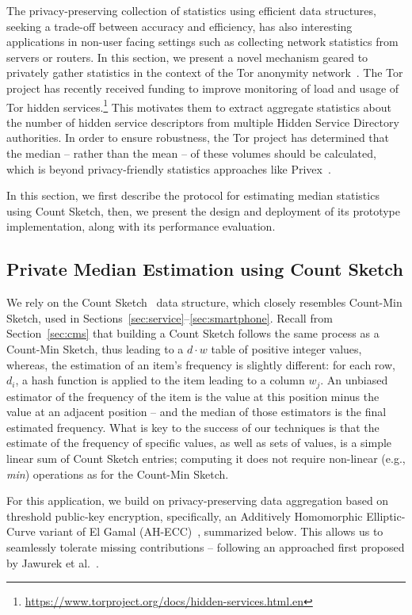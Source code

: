 \documentclass[conference]{IEEEtran}
\begin{document}
The privacy-preserving collection of statistics  using efficient data structures, seeking a trade-off between accuracy and efficiency, has also interesting applications in non-user facing settings such as 
collecting network statistics from servers or routers. 
In this section, we present a novel mechanism geared to  privately gather statistics in the context of the Tor anonymity network~\cite{Tor}. The Tor project has recently received funding to improve monitoring of load and usage of Tor hidden services.\footnote{\url{https://www.torproject.org/docs/hidden-services.html.en}} 
This motivates them to extract aggregate statistics about the number of hidden service descriptors from multiple Hidden Service Directory authorities. In order to ensure robustness, the Tor project has determined that the median -- rather than the mean -- of these volumes should be calculated, which is beyond privacy-friendly statistics approaches like Privex~\cite{elahi2014privex}. 

In this section, we first describe the protocol for estimating median statistics using Count Sketch, then, we present the design and deployment of its prototype implementation, along with its performance evaluation.





\subsection{Private Median Estimation using Count Sketch}
We rely on the Count Sketch~\cite{charikar2002finding} data structure, which closely resembles Count-Min Sketch, used in Sections~\ref{sec:service}--\ref{sec:smartphone}. Recall from Section~\ref{sec:cms} that building a Count Sketch follows the same process as a Count-Min Sketch, thus leading to a $d \cdot w$ table of positive integer values, whereas, the estimation of an item's frequency is slightly different: for each row, $d_i$, a hash function is applied to the item leading to a column $w_j$. An unbiased estimator of the frequency of the item is the value at this position minus the value at an adjacent position -- and the median of those estimators is the final estimated frequency. What is key to the success of our techniques is that the estimate of the frequency of specific values, as well as sets of values, is a simple linear sum of Count Sketch entries; computing it does not require non-linear (e.g., \emph{min}) operations as for the Count-Min Sketch. 


For this application, we build on privacy-preserving data aggregation based on threshold public-key encryption, 
specifically, an Additively Homomorphic Elliptic-Curve variant of El Gamal (AH-ECC)~\cite{benaloh1994dense}, summarized below. 
This allows us to seamlessly tolerate missing contributions -- following an approached first proposed by Jawurek et al.~\cite{jawurek2012fault}.
\end{document}

